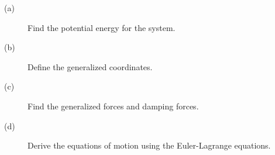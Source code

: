 \begin{description}\item[]
    \item[(a)] Find the potential energy for the system.
    \item[(b)] Define the generalized coordinates.
    \item[(c)] Find the generalized forces and damping forces.
    \item[(d)] Derive the equations of motion using the Euler-Lagrange equations.
\end{description}